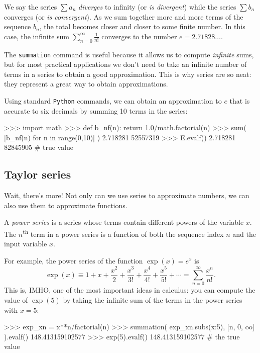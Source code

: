 \noindent
We say the series $\sum a_n$ \emph{diverges} to infinity (or \emph{is divergent})								
while the series $\sum b_n$ converges (or \emph{is convergent}).											
As we sum together more and more terms of the sequence $b_n$, the total becomes closer and closer to some finite number.
In this case, the infinite sum $\sum_{n=0}^\infty \frac{1}{n!}$ converges to the number $e=2.71828\ldots$.


The \texttt{summation} command is useful because it allows us to compute \emph{infinite} sums,
but for most practical applications we don't need to take an infinite number of terms in a series to obtain a good approximation. 
This is why series are so neat: they represent a great way to obtain approximations.

Using standard \texttt{Python} commands,  
we can obtain an approximation to $e$ that is accurate to six decimals by summing 10 terms in the series: 

\small
\begin{verbatimtab}
>>> import math
>>> def b_nf(n): 
        return 1.0/math.factorial(n)
>>> sum( [b_nf(n) for n in range(0,10)] )
2.718281 52557319
>>> E.evalf()
2.718281 82845905       # true value
\end{verbatimtab}
\normalsize
\subsection{Taylor series}
\label{calculus:taylor_series}

Wait, there's more! 
Not only can we use series to approximate numbers,
we can also use them to approximate functions.

A \emph{power series} is a series whose terms contain different powers of the variable $x$.						
The $n$\textsuperscript{th} term in a power series is a function of both the sequence index $n$ and the input variable $x$.

For example, the power series of the function $\exp(x)=e^x$ is 
\[
 \exp(x) \equiv  1 + x + \frac{x^2}{2} + \frac{x^3}{3!} + \frac{x^4}{4!} + \frac{x^5}{5!} + \cdots         
  =       \sum_{n=0}^\infty \frac{x^n}{n!}.
\]
This is, IMHO, one of the most important ideas in calculus:
you can compute the value of $\exp(5)$ by taking the infinite sum of the terms in the power series with $x=5$:



\small
\begin{verbatimtab}
>>> exp_xn = x**n/factorial(n)
>>> summation( exp_xn.subs({x:5}), [n, 0, oo] ).evalf()
148.413159102577
>>> exp(5).evalf()
148.413159102577        # the true value
\end{verbatimtab}
\normalsize

